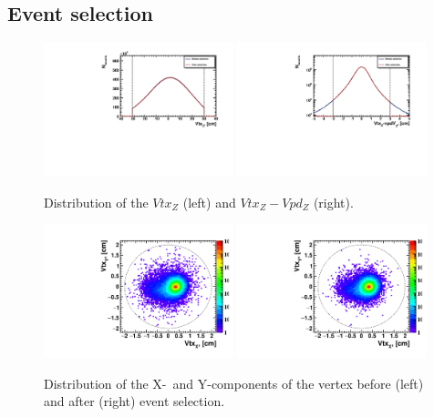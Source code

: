 \FloatBarrier
\subsection{Event selection}

\begin{figure}[ht]
    \begin{multicols}{2}
        \hfill
        \includegraphics[width=0.49\textwidth]{Figures/VtxZ.pdf}
        \hfill
        \includegraphics[width=0.49\textwidth]{Figures/VtxVpdZ.pdf}
    \end{multicols}
    \label{fig:VtxZCuts}
    \caption{Distribution of the $Vtx_Z$ (left) and $Vtx_Z - Vpd_Z$ (right).}
\end{figure}

\begin{figure}[ht]
    \begin{multicols}{2}
        \hfill
        \includegraphics[width=0.49\textwidth]{Figures/VtxXY0.pdf}
        \hfill
        \includegraphics[width=0.49\textwidth]{Figures/VtxXY1.pdf}
    \end{multicols}
    \label{fig:VtxXYCuts}
    \caption{Distribution of the X-~and Y-components of the vertex before (left) and after (right) event selection.}
\end{figure}

